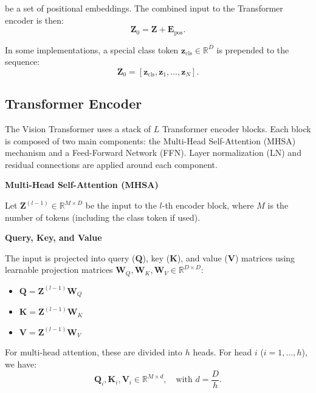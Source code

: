 be a set of positional embeddings. The combined input to the Transformer encoder is then:
\begin{equation}
  \mathbf{Z}_0 = \mathbf{Z} + \mathbf{E}_{\text{pos}}.
\end{equation}

In some implementations, a special class token \(\mathbf{z}_{\text{cls}} \in \mathbb{R}^{D}\) is prepended to the sequence:
\begin{equation}
  \mathbf{Z}_0 = \left[\mathbf{z}_{\text{cls}}, \mathbf{z}_1, \dots, \mathbf{z}_N \right].
\end{equation}

\subsection{Transformer Encoder}

The Vision Transformer uses a stack of \(L\) Transformer encoder blocks. Each block is composed of two main components: the Multi-Head Self-Attention (MHSA) mechanism and a Feed-Forward Network (FFN). Layer normalization (LN) and residual connections are applied around each component.

\textbf{Multi-Head Self-Attention (MHSA)}

Let \(\mathbf{Z}^{(l-1)} \in \mathbb{R}^{M \times D}\) be the input to the \(l\)-th encoder block, where \(M\) is the number of tokens (including the class token if used).

\textbf{Query, Key, and Value}

The input is projected into query (\(\mathbf{Q}\)), key (\(\mathbf{K}\)), and value (\(\mathbf{V}\)) matrices using learnable projection matrices \(\mathbf{W}_Q, \mathbf{W}_K, \mathbf{W}_V \in \mathbb{R}^{D \times D}\):

\begin{itemize}
  \item \(\mathbf{Q} = \mathbf{Z}^{(l-1)} \mathbf{W}_Q\)
  \item \(\mathbf{K} = \mathbf{Z}^{(l-1)} \mathbf{W}_K\)
  \item \(\mathbf{V} = \mathbf{Z}^{(l-1)} \mathbf{W}_V\)
\end{itemize}

For multi-head attention, these are divided into \(h\) heads. For head \(i\) (\(i=1,\dots,h\)), we have:
\begin{equation}
  \mathbf{Q}_i, \mathbf{K}_i, \mathbf{V}_i \in \mathbb{R}^{M \times d}, \quad \text{with } d = \frac{D}{h}.
\end{equation}

